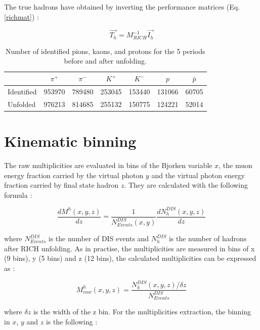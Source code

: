 The true hadrons have obtained by inverting the performance matrices (Eq. \ref{richmat}) :

\begin{equation}
  \overrightarrow{T_h} = M^{-1}_{RICH}\overrightarrow{I_h}
	\label{richmat}
\end{equation}

\begin{table}[!h]
  \caption{\label{HadNum} Number of identified pions, kaons, and protons for the 5 periods before and after unfolding.}
  \centering
  \begin{tabular}{lcccccc}
    \hline
     & $\pi^+$ & $\pi^-$ & $K^+$ & $K^-$ & $p$ & $\bar{p}$ \\
    \hline
    Identified & 953970 & 789480 & 253045 & 153440 & 131066 & 60705 \\
    Unfolded & 976213 & 814685 & 255132 & 150775 & 124221 & 52014 \\
    \hline
  \end{tabular}
\end{table}


\section{Kinematic binning}

The raw multiplicities are evaluated in bins of the Bjorken variable $x$, the muon energy fraction carried
by the virtual photon $y$ and the virtual photon energy fraction carried by final state hadron $z$. They
are calculated with the following formula :

\begin{equation}
  \frac{dM^h(x,y,z)}{dz}=\frac{1}{N^{DIS}_{Events}(x,y)}\frac{dN^{DIS}_{h}(x,y,z)}{dz}
\end{equation}

where $N^{DIS}_{Events}$ is the number of DIS events and $N^{DIS}_{h}$ is the number of
hadrons after RICH unfolding. As in practise, the multiplicities are measured in bins of
x (9 bins), y (5 bins) and z (12 bins), the calculated multiplicities can be expressed as :

\begin{equation}
  M^h_{raw}(x,y,z) = \frac{N^{DIS}_{h}(x,y,z)/\delta z}{N^{DIS}_{Events}}
\end{equation}

where $\delta z$ is the width of the z bin. For the multiplicities extraction, the binning in
$x$, $y$ and $z$ is the following :


